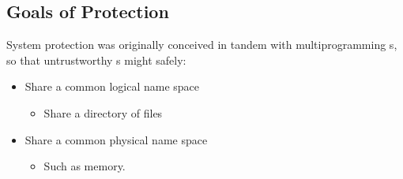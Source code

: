 \subsection{Goals of Protection}\label{subsec:Goals_of_Protection}
System protection was originally conceived in tandem with multiprogramming s, so that untrustworthy s might safely:
\begin{itemize}[noitemsep]
\item Share a common logical name space
  \begin{itemize}[noitemsep]
  \item Share a directory of files
  \end{itemize}
\item Share a common physical name space
  \begin{itemize}[noitemsep]
  \item Such as memory.
  \end{itemize}
\end{itemize}


